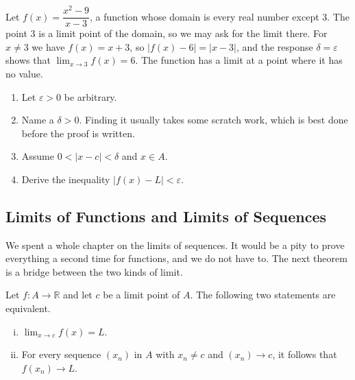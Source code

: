 \begin{example}
Let $f(x) = \dfrac{x^2 - 9}{x - 3}$, a function whose domain is every real number except $3$.  The point $3$ is a limit point of the domain, so we may ask for the limit there.  For $x \neq 3$ we have $f(x) = x + 3$, so $|f(x) - 6| = |x - 3|$, and the response $\delta = \varepsilon$ shows that $\lim_{x \to 3} f(x) = 6$.  The function has a limit at a point where it has no value.
\end{example}

\begin{enumerate}
	\item Let $\varepsilon > 0$ be arbitrary.
	\item Name a $\delta > 0$.  Finding it usually takes some scratch work, which is best done before the proof is written.
	\item Assume $0 < |x - c| < \delta$ and $x \in A$.
	\item Derive the inequality $|f(x) - L| < \varepsilon$.
\end{enumerate}

\subsection{Limits of Functions and Limits of Sequences}

We spent a whole chapter on the limits of sequences.  It would be a pity to prove everything a second time for functions, and we do not have to.  The next theorem is a bridge between the two kinds of limit.

\begin{theorem}\label{thm:sequential-criterion}
Let $f : A \to \mathbb{R}$ and let $c$ be a limit point of $A$.  The following two statements are equivalent.
\begin{enumerate}[(i)]
	\item $\lim_{x \to c} f(x) = L$.
	\item For every sequence $(x_n)$ in $A$ with $x_n \neq c$ and $(x_n) \to c$, it follows that $f(x_n) \to L$.
\end{enumerate}
\end{theorem}


